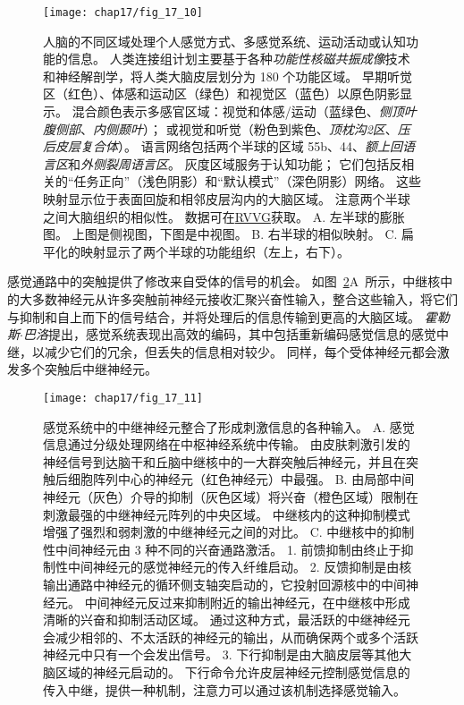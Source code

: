 \begin{figure}[htbp]
	\centering
	\texttt{[image: chap17/fig\_17\_10]}
	\caption{人脑的不同区域处理个人感觉方式、多感觉系统、运动活动或认知功能的信息。
		人类连接组计划主要基于各种\textit{功能性核磁共振成像}技术和神经解剖学，将人类大脑皮层划分为 180 个功能区域。
		早期听觉区（红色）、体感和运动区（绿色）和视觉区（蓝色）以原色阴影显示。
		混合颜色表示多感官区域：视觉和体感/运动（蓝绿色、\textit{侧顶叶腹侧部}、\textit{内侧颞叶}）；
		或视觉和听觉（粉色到紫色、\textit{顶枕沟2区}、\textit{压后皮层复合体}）。
		语言网络包括两个半球的区域 55b、44、\textit{额上回语言区}和\textit{外侧裂周语言区}。
		灰度区域服务于认知功能； 它们包括反相关的“任务正向”（浅色阴影）和“默认模式”（深色阴影）网络。 
		这些映射显示位于表面回旋和相邻皮层沟内的大脑区域。
		注意两个半球之间大脑组织的相似性\cite{glasser2016multi}。
		数据可在\href{https://balsa.wustl.edu/study/RVVG}{RVVG}获取。
		A. 左半球的膨胀图。 
		上图是侧视图，下图是中视图。
		B. 右半球的相似映射。
		C. 扁平化的映射显示了两个半球的功能组织（左上，右下）。}
	\label{fig:17_10}
\end{figure}


感觉通路中的突触提供了修改来自受体的信号的机会。 
如图~\ref{fig:17_11}A~所示，中继核中的大多数神经元从许多突触前神经元接收汇聚兴奋性输入，整合这些输入，将它们与抑制和自上而下的信号结合，并将处理后的信息传输到更高的大脑区域。
\textit{霍勒斯$\cdot$巴洛}提出，感觉系统表现出高效的编码，其中包括重新编码感觉信息的感觉中继，以减少它们的冗余，但丢失的信息相对较少。 
同样，每个受体神经元都会激发多个突触后中继神经元。


\begin{figure}[htbp]
	\centering
	\texttt{[image: chap17/fig\_17\_11]}
	\caption{感觉系统中的中继神经元整合了形成刺激信息的各种输入。 
		A. 感觉信息通过分级处理网络在中枢神经系统中传输。 
		由皮肤刺激引发的神经信号到达脑干和丘脑中继核中的一大群突触后神经元，并且在突触后细胞阵列中心的神经元（红色神经元）中最强\cite{biederman2013human}。
		B. 由局部中间神经元（灰色）介导的抑制（灰色区域）将兴奋（橙色区域）限制在刺激最强的中继神经元阵列的中央区域。 
		中继核内的这种抑制模式增强了强烈和弱刺激的中继神经元之间的对比。 
		C. 中继核中的抑制性中间神经元由 3 种不同的兴奋通路激活。
		1. 前馈抑制由终止于抑制性中间神经元的感觉神经元的传入纤维启动。 
		2. 反馈抑制是由核输出通路中神经元的循环侧支轴突启动的，它投射回源核中的中间神经元。 
		中间神经元反过来抑制附近的输出神经元，在中继核中形成清晰的兴奋和抑制活动区域。 
		通过这种方式，最活跃的中继神经元会减少相邻的、不太活跃的神经元的输出，从而确保两个或多个活跃神经元中只有一个会发出信号。 
		3. 下行抑制是由大脑皮层等其他大脑区域的神经元启动的。 
		下行命令允许皮层神经元控制感觉信息的传入中继，提供一种机制，注意力可以通过该机制选择感觉输入。}
	\label{fig:17_11}
\end{figure}


